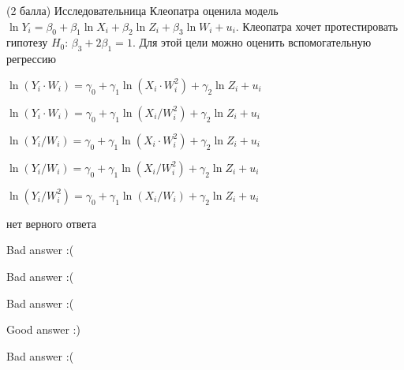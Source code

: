 
\begin{question}
(2 балла) Исследовательница Клеопатра оценила модель
\(\ln Y_i = \beta_0 + \beta_1 \ln X_i + \beta_2 \ln Z_i + \beta_3 \ln W_i + u_i\).
Клеопатра хочет протестировать гипотезу \(H_0\):
\(\beta_3 + 2\beta_1 = 1\). Для этой цели можно оценить вспомогательную
регрессию
\begin{answerlist}[2]
  \item \(\ln(Y_i \cdot W_i) = \gamma_0 + \gamma_1 \ln (X_i \cdot W_i^2) + \gamma_2 \ln Z_i + u_i\)
  \item \(\ln(Y_i \cdot W_i) = \gamma_0 + \gamma_1 \ln (X_i/W_i^2) + \gamma_2 \ln Z_i + u_i\)
  \item \(\ln(Y_i/W_i) = \gamma_0 + \gamma_1 \ln (X_i \cdot W_i^2) + \gamma_2 \ln Z_i + u_i\)
  \item \(\ln(Y_i/W_i) = \gamma_0 + \gamma_1 \ln(X_i/W_i^2) + \gamma_2 \ln{Z_i} + u_i\)
  \item \(\ln(Y_i/W_i^2) = \gamma_0 + \gamma_1 \ln (X_i/W_i) + \gamma_2 \ln Z_i + u_i\)
  \item нет верного ответа
\end{answerlist}
\end{question}

\begin{solution}
\begin{answerlist}
  \item Bad answer :(
  \item Bad answer :(
  \item Bad answer :(
  \item Good answer :)
  \item Bad answer :(
\end{answerlist}
\end{solution}
